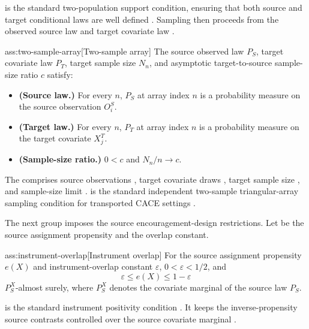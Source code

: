  is the standard two-population support condition, ensuring that both source and target conditional laws are well defined \citep{ChenHuang2025}. Sampling then proceeds from the observed source law  and target covariate law .

\begin{assumptionv}{ass:two-sample-array}[Two-sample array]
The source observed law \(P_S\), target covariate law \(P_T\), target sample size \(N_n\), and asymptotic target-to-source sample-size ratio \(c\) satisfy:
\begin{itemize}
\item \textbf{(Source law.)} For every \(n\), \(P_S\) at array index \(n\) is a probability measure on the source observation \(O_i^S\).
\item \textbf{(Target law.)} For every \(n\), \(P_T\) at array index \(n\) is a probability measure on the target covariate \(X_j^T\).
\item \textbf{(Sample-size ratio.)} \(0<c\) and \(N_n/n\to c\).
\end{itemize}
\end{assumptionv}

The  comprises source observations , target covariate draws , target sample size , and sample-size limit .  is the standard independent two-sample triangular-array sampling condition for transported CACE settings \citep{ChenHuang2025}.

The next group imposes the source encouragement-design restrictions. Let  be the source assignment propensity and  the overlap constant.

\begin{assumptionv}{ass:instrument-overlap}[Instrument overlap]
For the source assignment propensity \(e(X)\) and instrument-overlap constant \(\varepsilon\), \(0<\varepsilon<1/2\), and
\[
\varepsilon\le e(X)\le 1-\varepsilon
\]
\(P_S^X\)-almost surely, where \(P_S^X\) denotes the covariate marginal of the source law \(P_S\).
\end{assumptionv}

 is the standard instrument positivity condition \citep{ChenHuang2025}. It keeps the inverse-propensity source contrasts controlled over the source covariate marginal .

